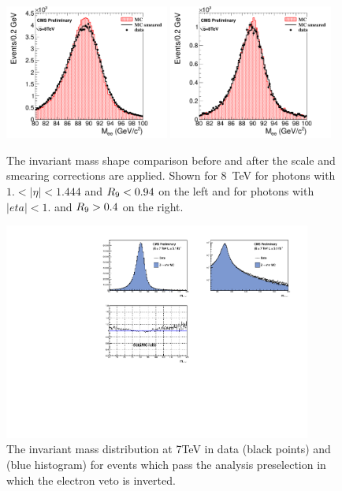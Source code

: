 \begin{figure}
  \includegraphics[width=0.48\textwidth]{analysis_comps/plots/smearing_EB_highEta_lowR9.pdf}
  \includegraphics[width=0.48\textwidth]{analysis_comps/plots/smearing_EB_lowEta_highR9.pdf}
  \caption{The \Zee invariant mass shape comparison before and after the scale and smearing corrections are applied. Shown for 8~TeV for photons with $1.<|\eta|<1.444$ and $R_{9}<0.94$ on the left and for photons with $|eta|<1.$ and $R_{9}>0.4$ on the right.}
  \label{fig:scale_smearing_Zee}
\end{figure}

\begin{figure}
  \includegraphics[width=0.9\textwidth]{analysis_comps/plots/smearing_mass_Zee_7TeV.pdf}
  \caption{The \Zee invariant mass distribution at 7TeV in data (black points) and \MC (blue histogram) for events which pass the analysis preselection in which the electron veto is inverted.}
  \label{fig:scale_smearing_analysis_7TeV}
\end{figure}

